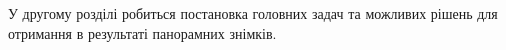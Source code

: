 У другому розділі робиться постановка головних 
задач та можливих рішень для отримання в 
результаті панорамних знімків.
